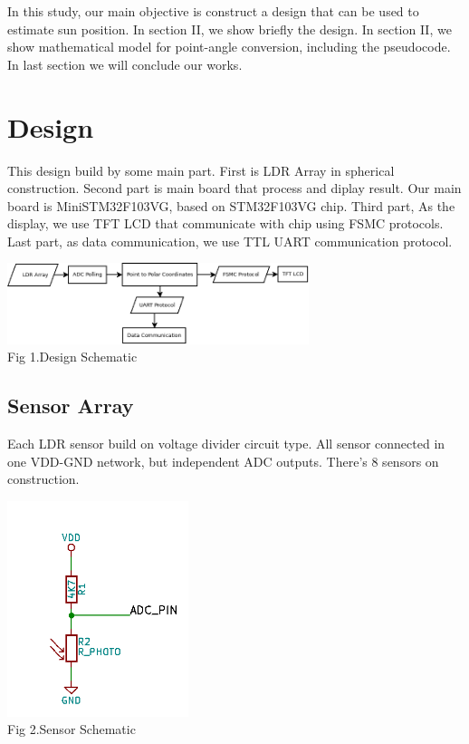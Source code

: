 \documentclass[journal]{IEEEtran}
\begin{document}
In this study, our main objective is construct a design that can be used to estimate sun position.
In section II, we show briefly the design.
In section II, we show mathematical model for point-angle conversion, including the pseudocode. 
In last section we will conclude our works.


\section{Design}
This design build by some main part. 
First is LDR Array in spherical construction.
Second part is main board that process and diplay result.
Our main board is MiniSTM32F103VG, based on STM32F103VG chip.
Third part, As the display, we use TFT LCD that communicate with chip using FSMC protocols.
Last part, as data communication, we use TTL UART communication protocol.\\

\begin{center} 
\includegraphics[width=250pt]{skema}\\
Fig 1.Design Schematic
\end{center}

\subsection{Sensor Array}
Each LDR sensor build on voltage divider circuit type.
All sensor connected in one VDD-GND network, but independent ADC outputs.
There's 8 sensors on construction.

\begin{center} 
\includegraphics[width=150pt]{sensor}\\
Fig 2.Sensor Schematic
\end{center}
\end{document}
